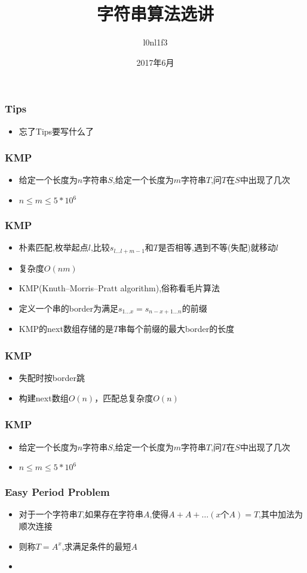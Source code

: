 \documentclass[notheorems]{beamer}
\begin{document}
\title[字符串算法选讲]{字符串算法选讲}
\author[l0nl1f3]{l0nl1f3}
\date[June, 2017]{2017年6月}
\frame{\titlepage}

\begin{frame}
\frametitle{Tips}
\begin{itemize}[]  
\item 忘了Tips要写什么了
\end{itemize}
\end{frame}

\begin{frame}
\frametitle{KMP}
\begin{itemize}[]
\item 给定一个长度为$n$字符串$S$,给定一个长度为$m$字符串$T$,问$T$在$S$中出现了几次 
\pause
\item $n\leq m\leq 5*10^6$
\end{itemize}
\end{frame}

\begin{frame}
\frametitle{KMP}
\begin{itemize}[]
\item 朴素匹配,枚举起点$l$,比较$s_{l\ldots l+m-1}$和$T$是否相等,遇到不等(失配)就移动$l$
\item 复杂度$O(nm)$
\pause
\item KMP(Knuth–Morris–Pratt algorithm),俗称看毛片算法
\pause
\item 定义一个串的border为满足$s_{1\ldots x} = s_{n-x+1\ldots n}$的前缀
\pause
\item KMP的next数组存储的是$T$串每个前缀的最大border的长度
\end{itemize}
\end{frame}

\begin{frame}
\frametitle{KMP}
\begin{itemize}[]
\item 失配时按border跳
\pause
\item 构建next数组$O(n)$，匹配总复杂度$O(n)$
\end{itemize}
\end{frame}

\begin{frame}
\frametitle{KMP}
\begin{itemize}[]
\item 给定一个长度为$n$字符串$S$,给定一个长度为$m$字符串$T$,问$T$在$S$中出现了几次 
\pause
\item $n\leq m\leq 5*10^6$
\end{itemize}
\end{frame}

\begin{frame}
\frametitle{Easy Period Problem}
\begin{itemize}[]
\item 对于一个字符串$T$,如果存在字符串$A$,使得$A+A+\ldots (x个A)= T$,其中加法为顺次连接
\item 则称$T=A^x$,求满足条件的最短$A$
\pause
\item 
\end{itemize}
\end{frame}
\end{document}
